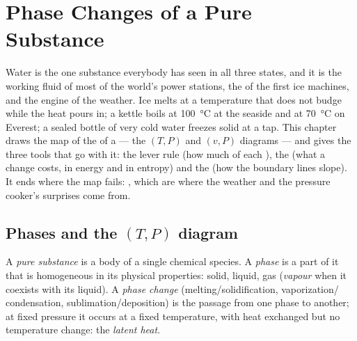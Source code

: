 \chapter{Phase Changes of a Pure Substance}\label{ch:b1:phase-changes}

Water is the one substance everybody has seen in all three states,
and it is the working fluid of most of the world's power stations, the
 of the first ice machines, and the engine of the weather.
Ice melts at a temperature that does not budge while the heat pours
in; a kettle boils at \qty{100}{\degreeCelsius} at the seaside and at
\qty{70}{\degreeCelsius} on Everest; a sealed bottle of very cold water
freezes solid at a tap. This chapter draws the map of the  of a
 --- the $(T, P)$ and $(v, P)$ diagrams --- and gives the
three tools that go with it: the lever rule (how much of each ),
the  (what a change costs, in energy and in entropy) and the
 (how the boundary lines slope). It ends
where the map fails: , which are where the weather
and the pressure cooker's surprises come from.

\section{Phases and the $(T, P)$ diagram}

\begin{definition}\label{def:b1:phase-changes:phase}
A \emph{pure substance} is a body of a single chemical species. A
\emph{phase} is a part of it that is homogeneous in its physical
properties: solid, liquid, gas (\emph{vapour} when it coexists with its
liquid). A \emph{phase change} (melting/solidification, vaporization/
condensation, sublimation/deposition) is the passage from one phase to
another; at fixed pressure it occurs at a fixed temperature, with heat
exchanged but no temperature change: the \emph{latent heat}.
\end{definition}

